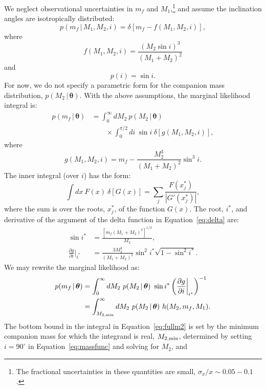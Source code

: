 \documentclass[apjl]{emulateapj}
\newcommand{\given}{\,|\,}
\newcommand{\bs}[1]{\boldsymbol{#1}}
\newcommand{\degree}{^{\circ}}
\newcommand{\eqn}{Equation~}
\newcommand{\mf}{m_f}
\begin{document}
We neglect observational uncertainties in $\mf$ and $M_1$,\footnote{The fractional uncertainties in these quantities are small, $\sigma_x / x \sim 0.05-0.1$ \citep{gianninas14}.} and assume the inclination angles are isotropically distributed:
\begin{equation}
	p(\mf \given M_1, M_2, i) = \delta \left[\mf - f(M_1, M_2, i) \right],
\end{equation}
where
\begin{equation}
	f(M_1, M_2, i) = \frac{(M_2 \sin i)^3}{(M_1 + M_2)^2}
\end{equation}
and
\begin{equation}
p(i) = \sin i.
\end{equation}
For now, we do not specify a parametric form for the companion mass distribution, $p(M_2 \given \bs{\theta})$. With the above assumptions, the marginal likelihood integral is:
\begin{align}
    p(\mf \given \bs{\theta}) &= \int_{0}^\infty dM_2 ~p(M_2 \given \bs{\theta})  \nonumber \\
    & \qquad {} \times \int_0^{\pi/2} di ~\sin i ~ \delta \left[g(M_1,M_2,i) \right]\label{eq:delta},
\end{align}
where
\begin{equation}
	g(M_1,M_2,i) = \mf - \frac{M_2^3}{(M_1+M_2)^2}\sin^3 i.
\end{equation}
The inner integral (over $i$) has the form:
\begin{equation}
    \int dx~F(x)~\delta \left[ G(x) \right] = \sum_j \frac{F(x^*_j)}{|G'(x^*_j)|},
\end{equation}
where the sum is over the roots, $x^*_j$, of the function $G(x)$. The root, $i^*$, and derivative of the argument of the delta function in \eqn\ref{eq:delta} are: 
\begin{align}
	\sin i^* &= \frac{ \left[\mf(M_1+M_2)^2 \right]^{1/3}}{M_2}, \\
	\frac{\partial g}{\partial i}\bigg\rvert_{i^*} &= \frac{3M_2^3}{(M_1+M_2)^2} \sin^2 i^* \sqrt{1 - \sin^2 i^*}.
\end{align}
We may rewrite the marginal likelihood as:
\begin{align}
	p(\mf \given \bs{\theta}) &= \int_{0}^\infty dM_2~p(M_2 \given \bs{\theta})~\sin i^* \left(\frac{\partial g}{\partial i}\bigg\rvert_{i^*}\right)^{-1}\\
	&= \int_{M_{2,{\rm min}}}^\infty dM_2~p(M_2 \given \bs{\theta})~h(M_2, \mf, M_1). \label{eq:fullm2}
\end{align}
The bottom bound in the integral in \eqn\ref{eq:fullm2} is set by the minimum companion mass for which the integrand is real, $M_{2,{\rm min}}$, determined by setting $i=90\degree$ in \eqn\ref{eq:massfunc} and solving for $M_2$, and
\end{document}
